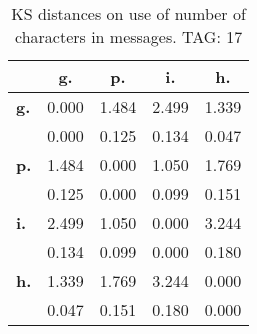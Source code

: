 \begin{table}[h!]
\begin{center}
\begin{tabular}{| l || c | c | c | c |}\hline
 & {\bf g.} & {\bf p.} & {\bf i.} & {\bf h.} \\\hline\hline
{\bf g.} & 0.000 & 1.484 & 2.499 & 1.339 \\
{\bf } & 0.000 & 0.125 & 0.134 & 0.047 \\\hline
{\bf p.} & 1.484 & 0.000 & 1.050 & 1.769 \\
{\bf } & 0.125 & 0.000 & 0.099 & 0.151 \\\hline
{\bf i.} & 2.499 & 1.050 & 0.000 & 3.244 \\
{\bf } & 0.134 & 0.099 & 0.000 & 0.180 \\\hline
{\bf h.} & 1.339 & 1.769 & 3.244 & 0.000 \\
{\bf } & 0.047 & 0.151 & 0.180 & 0.000 \\\hline
\end{tabular}
\caption{KS distances on use of number of characters in messages. TAG: 17}
\end{center}
\end{table}